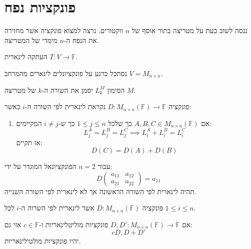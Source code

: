 \documentclass{tstextbook}
\begin{document}
\section{פונקציות נפח}

ננסה לשוב כעת על מטריצה בתור אוסף של \(n\) ווקטורים. נרצה למצוא פונקציה אשר מחזירה את הנפח ה-\(n\) מימדי של המטריצה.

\begin{definition}
העתקה לינארית \(T:V\to\mathbb{F}\).

\end{definition}
נסתכל כרגע על פונקציונלים לינארים מהמרחב \(V=M_{n\times n}\).

\begin{symbolize}
הסימון \(L_{k}^{M}\) יסמן את השורה ה-\(k\) של מטריצה \(M\).

\end{symbolize}
\begin{definition}
פונקציה \(D:M_{n\times n}\left( \mathbb{F}  \right)\to \mathbb{F}\) נקראת לינארית לפי השורה ה-\(i\) כאשר:

  \begin{enumerate}
    \item אם \(A,B,C \in M_{n\times n}\left( \mathbb{F}  \right)\) כך שלכל \(1\leq j\leq n\) כך ש-\(i\neq j\) המקיימים: 
$$L_{j}^{A}=L_{j}^{B}=L_{j}^{C}\implies L_{i}^{A}+L_{i}^{B}=L_{i}^{C}$$
אז תקיים:
$$D(C)=D(A)+D(B)$$
  \end{enumerate}
\end{definition}
\begin{example}
עבור \(n=2\) הפונקציונאל המוגדר על ידי:
$$D\begin{pmatrix}a_{11} & a_{12} \\a_{21} & a_{22}
\end{pmatrix}=a_{11}$$
תהיה לינארית לפי השורה הראשונה אך לא לינארית לפי השורה השנייה.

\end{example}
\begin{definition}[מולטילינאריות]
פונקציה \(D:M_{n\times n}\left( \mathbb{F}  \right)\) אשר לינארית לפי השרוה ה-\(i\) לכל \(1\leq i\leq n\).

\end{definition}
\begin{proposition}
אם \(D,D':M_{n\times n}\left( \mathbb{F}  \right)\to \mathbb{F}\) פונקציות מוליטלינאריות ו-\(c \in \mathbb{F}\) אזי גם:
$$c D, D+D'$$
יהיו פונקציות מולטילינאריות.

\end{proposition}
\end{document}
